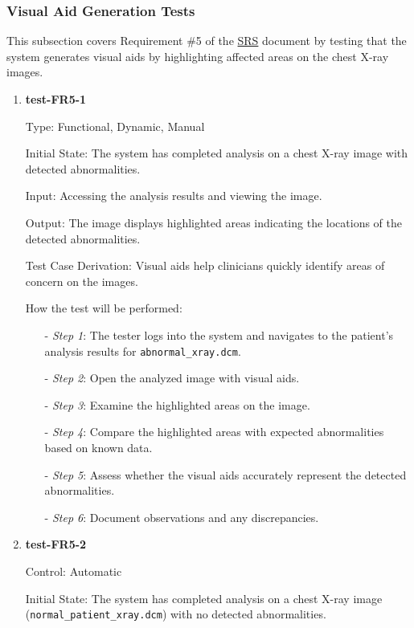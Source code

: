 \documentclass[12pt, titlepage]{article}
\begin{document}
\subsubsection{ Visual Aid Generation Tests}

This subsection covers Requirement \#5 of the \href{https://github.com/RezaJodeiri/CXR-Capstone/blob/main/docs/SRS/SRS.pdf}{SRS} \citep{SRS}
document by testing that the system generates visual aids by highlighting affected areas on the chest X-ray images.

\begin{enumerate}

\item \textbf{test-FR5-1} \label{test-FR5-1}

Type: Functional, Dynamic, Manual

Initial State: The system has completed analysis on a chest X-ray image with detected abnormalities.

Input: Accessing the analysis results and viewing the image.

Output: The image displays highlighted areas indicating the locations of the detected abnormalities.

Test Case Derivation: Visual aids help clinicians quickly identify areas of concern on the images.

How the test will be performed:
\begin{itemize}
  \item[-] \textit{Step 1}: The tester logs into the system and navigates to the patient's analysis results for \texttt{abnormal\_xray.dcm}.
  \item[-] \textit{Step 2}: Open the analyzed image with visual aids.
  \item[-] \textit{Step 3}: Examine the highlighted areas on the image.
  \item[-] \textit{Step 4}: Compare the highlighted areas with expected abnormalities based on known data.
  \item[-] \textit{Step 5}: Assess whether the visual aids accurately represent the detected abnormalities.
  \item[-] \textit{Step 6}: Document observations and any discrepancies.
\end{itemize}

\item \textbf{test-FR5-2} \label{test-FR5-2}

Control: Automatic

Initial State: The system has completed analysis on a chest X-ray image (\texttt{normal\_patient\_xray.dcm}) with no detected abnormalities.


\end{enumerate}
\end{document}
